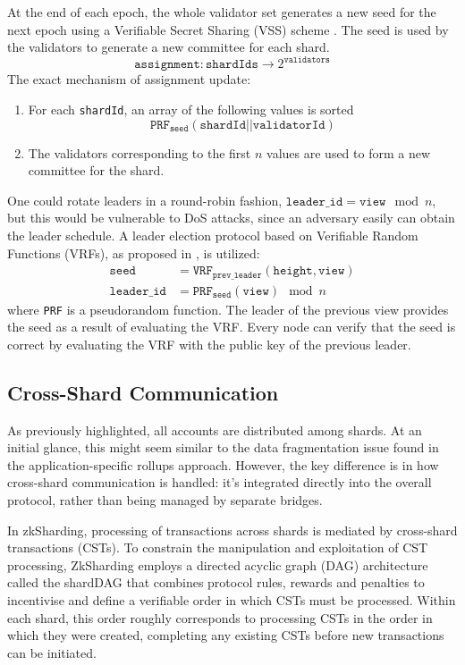 At the end of each epoch, the whole validator set generates a new seed for the next epoch using a Verifiable Secret Sharing (VSS) scheme \cite{VSS,RapidChain}.
The seed is used by the validators to generate a new committee for each shard.
$$
\texttt{assignment} : \texttt{shardIds} \to 2^\texttt{validators}
$$
The exact mechanism of assignment update:
\begin{enumerate}
\item For each \texttt{shardId}, an array of the following values is sorted
$$
\texttt{PRF}_{\texttt{seed}}(\texttt{shardId} || \texttt{validatorId})
$$
\item The validators corresponding to the first $n$ values are used to form a new committee for the shard.
\end{enumerate}

One could rotate leaders in a round-robin fashion, $\texttt{leader\_id} = \texttt{view} \mod n$,
but this would be vulnerable to DoS attacks, since an adversary easily can obtain the leader schedule.
A leader election protocol based on Verifiable Random Functions (VRFs), as proposed in \cite{LibraBFT}, is utilized:
\begin{align*}
    \texttt{seed} &= \texttt{VRF}_{\texttt{prev\_leader}}(\texttt{height}, \texttt{view}) \\
    \texttt{leader\_id} &= \texttt{PRF}_{\texttt{seed}}(\texttt{view}) \mod n
\end{align*}
where \texttt{PRF} is a pseudorandom function.
The leader of the previous view provides the seed as a result of evaluating the VRF.
Every node can verify that the seed is correct by evaluating the VRF with the public key of the previous leader.

\subsection{Cross-Shard Communication}
\label{section:cross-shard}

As previously highlighted, all accounts are distributed among shards. 
At an initial glance, this might seem similar to the data fragmentation issue 
found in the application-specific rollups approach. 
However, the key difference is in how cross-shard communication is handled: 
it's integrated directly into the overall protocol, 
rather than being managed by separate bridges. 

In zkSharding, processing of transactions across shards is mediated by cross-shard transactions (CSTs). 
To constrain the manipulation and exploitation of CST processing, ZkSharding employs a directed acyclic graph (DAG) architecture called the shardDAG that combines protocol rules, rewards and penalties to incentivise and define a verifiable order in which CSTs must be processed.
Within each shard, this order roughly corresponds to processing CSTs in the order in which they were created, completing any existing CSTs before new transactions can be initiated.

